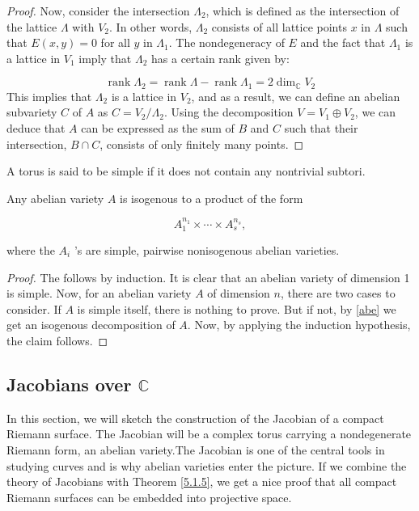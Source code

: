 \begin{remark}
\begin{proof}
Now, consider the intersection $\Lambda_{2}$, which is defined as the intersection of the lattice $\Lambda$ with $V_{2}$. In other words, $\Lambda_{2}$ consists of all lattice points $x$ in $\Lambda$ such that $E(x, y) = 0$ for all $y$ in $\Lambda_{1}$. The nondegeneracy of $E$ and the fact that $\Lambda_{1}$ is a lattice in $V_{1}$ imply that $\Lambda_{2}$ has a certain rank given by:

$$
\operatorname{rank} \Lambda_{2} = \operatorname{rank} \Lambda - \operatorname{rank} \Lambda_{1} = 2 \operatorname{dim}_{\mathbb{C}} V_{2}
$$
This implies that $\Lambda_{2}$ is a lattice in $V_{2}$, and as a result, we can define an abelian subvariety $C$ of $A$ as $C = V_{2} / \Lambda_{2}$. Using the decomposition $V = V_{1} \oplus V_{2}$, we can deduce that $A$ can be expressed as the sum of $B$ and $C$ such that their intersection, $B \cap C$, consists of only finitely many points.
\end{proof}

\begin{definition}
    A torus is said to be simple if it does not contain any nontrivial subtori. 
\end{definition}
    \begin{corollary}
       Any abelian variety $A$ is isogenous to a product of the form

$$
A_{1}^{n_{1}} \times \cdots \times A_{s}^{n_{s}},
$$

where the $A_{i}$ 's are simple, pairwise nonisogenous abelian varieties.

    \end{corollary}
\begin{proof}
    The follows by induction. It is clear that an abelian variety of dimension 1 is simple. Now, for an abelian variety $A$ of dimension $n$, there are two cases to consider. If $A$ is simple itself, there is nothing to prove. But if not, by \ref{abe} we get an isogenous decomposition of $A$. Now, by applying the induction hypothesis, the claim follows. 
\end{proof}
\end{remark}
\subsection{Jacobians over $\mathbb{C}$}
In this section, we will sketch the construction of the Jacobian of a compact Riemann surface. The Jacobian will be a complex torus carrying a nondegenerate Riemann form, an abelian variety.The Jacobian is one of the central tools in studying curves and is why abelian varieties enter the picture. If we combine the theory of Jacobians with Theorem \ref{5.1.5}, we get a nice proof that all compact Riemann surfaces can be embedded into projective space. 
\\

